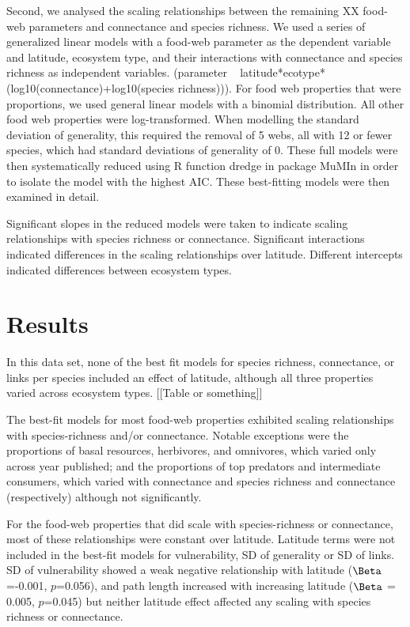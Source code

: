 Second, we analysed the scaling relationships between the remaining XX food-
web parameters and connectance and species richness. We used a series of
generalized linear models with a food-web parameter as the dependent variable
and latitude, ecosystem type, and their interactions with connectance and
species richness as independent variables. (parameter ~
latitude*ecotype*(log10(connectance)+log10(species richness))). For food web
properties that were proportions, we used general linear models with a
binomial distribution. All other food web properties were log-transformed.
When modelling the standard deviation of generality, this
required the removal of 5 webs, all with 12 or fewer species, which had
standard deviations of generality of 0. These full models were then
systematically reduced using R function dredge \cite{} in package MuMIn
\cite{} in order to isolate the model with the highest AIC. These best-fitting models were 
then examined in detail.


Significant slopes in the reduced models were taken to indicate scaling
relationships with species richness or connectance. Significant interactions
indicated differences in the scaling relationships over latitude. Different
intercepts indicated differences between ecosystem types.


\section*{Results}

In this data set, none of the best fit models for species richness, connectance, or links per species included an 
effect of latitude, although all three properties varied across ecosystem types. [[Table or something]]


The best-fit models for most food-web properties exhibited scaling relationships with species-richness and/or 
connectance. Notable exceptions were the proportions of basal resources, herbivores, and omnivores, which varied only 
across year published; and the proportions of top predators and intermediate consumers, which varied with connectance 
and species richness and connectance (respectively) although not significantly.


For the food-web properties that did scale with species-richness or connectance, most of these relationships were 
constant over latitude. Latitude terms were not included in the best-fit models for vulnerability, SD of generality or 
SD of links. SD of vulnerability showed a weak negative relationship with latitude ($\Beta$=-0.001, $p$=0.056), 
and path length increased with increasing 
latitude ($\Beta$ = 0.005, $p$=0.045) but neither latitude effect affected any scaling with species richness or 
connectance.


